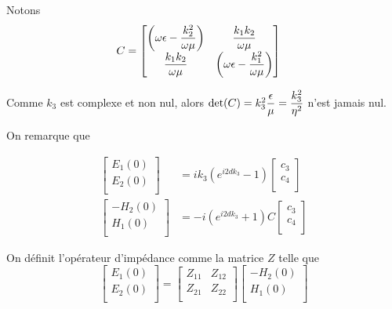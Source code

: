 Notons
\begin{align}
    C &=
    \begin{bmatrix}
        \left(\omega\epsilon-\dfrac{k_2^2}{\omega\mu}\right) & \dfrac{k_1k_2}{\omega\mu}\\
        \dfrac{k_1k_2}{\omega\mu} & \left(\omega\epsilon-\dfrac{k_1^2}{\omega\mu}\right)
    \end{bmatrix}
\end{align}

Comme $k_3$ est complexe et non nul, alors $\det(C) = k_3^2\dfrac{\epsilon}{\mu}=\dfrac{k_3^2}{\eta^2}$ n'est jamais nul.

On remarque que 

\begin{align}
    \begin{bmatrix}
        E_1(0)\\
        E_2(0)\\
    \end{bmatrix}
    & = ik_3\left(e^{i2dk_3} - 1\right)
    \begin{bmatrix}
        c_3 \\
        c_4 \\
    \end{bmatrix}\\
    \begin{bmatrix}
        -H_2(0)\\
        H_1(0)\\
    \end{bmatrix}
    & =  -i\left( e^{i2dk_3} + 1 \right) C
    \begin{bmatrix}
        c_3 \\
        c_4 \\
    \end{bmatrix}
\end{align}

On définit l'opérateur d'impédance comme la matrice $Z$ telle que 
\begin{equation}
    \begin{bmatrix}
        E_1(0)\\
        E_2(0)\\
    \end{bmatrix}
    =
    \begin{bmatrix}
        Z_{11} & Z_{12} \\
        Z_{21} & Z_{22} \\
    \end{bmatrix}
    \begin{bmatrix}
        -H_2(0)\\
        H_1(0)\\
    \end{bmatrix}
\end{equation}

